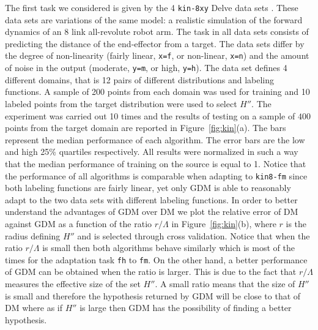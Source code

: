 \documentclass[twoside,11pt]{article}
\newcommand{\tts}{\tt \small}
\newcommand{\1}{\mat{1}}
\begin{document}
The first task we considered is given by the 4 {\tt kin-8xy} Delve
data sets \citep{Delve}. These data sets are variations of the same
model: a realistic simulation of the forward dynamics of an 8 link
all-revolute robot arm. The task in all data sets consists of
predicting the distance of the end-effector from a target.  The data
sets differ by the degree of non-linearity (fairly linear, {\tts x=f},
or non-linear, {\tts x=n}) and the amount of noise in the output
(moderate, {\tts y=m}, or high, {\tts y=h}). The data set defines 4
different domains, that is 12 pairs of different distributions and
labeling functions. A sample of 200 points from each domain was used
for training and 10 labeled points from the target distribution were
used to select $H''$. The experiment was carried out 10 times and the
results of testing on a sample of $400$ points from the target domain
are reported in Figure~\ref{fig:kin}(a). The bars represent the median
performance of each algorithm. The error bars are the low and high
25\% quartiles respectively. All results were normalized in such a way
that the median performance of training on the source is equal to 1.
Notice that the performance of all algorithms is comparable when
adapting to {\tt kin8-fm} since both labeling functions are fairly
linear, yet only GDM is able to reasonably adapt to the two data sets
with different labeling functions. In order to better understand the
advantages of GDM over DM we plot the relative error of DM against GDM
as a function of the ratio $r / \Lambda$ in
Figure~\ref{fig:kin}(b), where $r$ is the radius defining $H''$ and
is selected through cross validation. Notice that when the ratio
$r / \Lambda$ is small then both algorithms behave similarly which is most
of the times for the adaptation task {\tts fh} to {\tts fm}. On the
other hand, a better performance of GDM can be obtained when the ratio
is larger. This is due to the fact that $r/\Lambda$ measures the
effective size of the set $H''$. A small ratio means that the size of
$H''$ is small and therefore the hypothesis returned by GDM will be
close to that of DM where as if $H''$ is large then GDM has the
possibility of finding  a better hypothesis.
\end{document}
